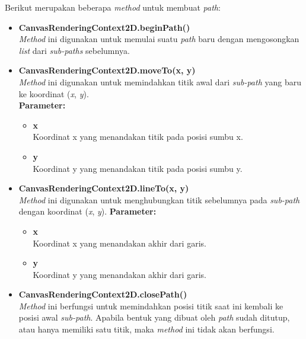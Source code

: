 \begin{enumerate}
	Berikut merupakan beberapa \textit{method} untuk membuat \textit{path}:
	\begin{itemize}
		\item \textbf{CanvasRenderingContext2D.beginPath()} \\ 
		\textit{Method} ini digunakan untuk memulai suatu \textit{path} baru dengan mengosongkan \textit{list} dari \textit{sub-paths} sebelumnya.
		
		\item \textbf{CanvasRenderingContext2D.moveTo(x, y)} \\
		\textit{Method} ini digunakan untuk memindahkan titik awal dari \textit{sub-path} yang baru ke koordinat (\textit{x}, \textit{y}). \\
		\textbf{Parameter:}
		\begin{itemize}
			\item \textbf{x} \\ Koordinat x yang menandakan titik pada posisi sumbu x.
			\item \textbf{y} \\ Koordinat y yang menandakan titik pada posisi sumbu y.
		\end{itemize}
		
		\item \textbf{CanvasRenderingContext2D.lineTo(x, y)} \\
		\textit{Method} ini digunakan untuk menghubungkan titik sebelumnya pada \textit{sub-path} dengan koordinat (\textit{x}, \textit{y}).
		\textbf{Parameter:}
		\begin{itemize}
			\item \textbf{x} \\ Koordinat x yang menandakan akhir dari garis.
			\item \textbf{y} \\ Koordinat y yang menandakan akhir dari garis.
		\end{itemize}
		
		\item \textbf{CanvasRenderingContext2D.closePath()} \\
		\textit{Method} ini berfungsi untuk memindahkan posisi titik saat ini kembali ke posisi awal \textit{sub-path}. Apabila bentuk yang dibuat oleh \textit{path} sudah ditutup, atau hanya memiliki satu titik, maka \textit{method} ini tidak akan berfungsi.
		

\end{itemize}
\end{enumerate}
